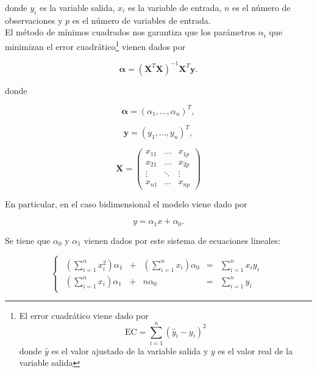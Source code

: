 donde $y_i$ es la variable salida, $x_{i}$ es la variable de entrada, $n$ es el número de observaciones y $p$ es el número de variables de entrada.\\

El método de mínimos cuadrados nos garantiza que los parámetros $\alpha_i$ que minimizan el error cuadrático\footnote{El error cuadrático viene dado por \begin{equation}
\mathrm{EC} = \sum_{i=1}^{n} (\hat{y}_i - y_i)^2 
\end{equation} 
donde $\hat{y}$ es el valor ajustado de la variable salida y $y$ es el valor real de la variable salida} vienen dados por

\begin{equation}
\boldsymbol{\alpha} = (\mathbf{X}^T \mathbf{X})^{-1} \mathbf{X}^T \mathbf{y}.
\end{equation}

donde 

\begin{equation*}
\mathbf{\alpha} = (\alpha_1,...,\alpha_n)^T,
\end{equation*}

\begin{equation*}
\mathbf{y} = (y_1,...,y_n)^T,
\end{equation*}

\begin{equation*}
\mathbf{X} = \left(\begin{matrix}
x_{11} & ... & x_{1p} \\
x_{21} & ... & x_{2p} \\
\vdots & \ddots & \vdots \\
x_{n1} & \dots & x_{np}
\end{matrix}\right)
\end{equation*}

En particular, en el caso bidimensional el modelo viene dado por

\begin{equation}
y = \alpha_1 x + \alpha_0.
\end{equation}

Se tiene que $\alpha_0$ y $\alpha_1$ vienen dados por este sistema de ecuaciones lineales:

\begin{equation}
\begin{cases}
\begin{array}{ccccc}
\left(\displaystyle\sum_{i=1}^{n} x_i^2\right) \alpha_1 & + & \left(\displaystyle\sum_{i=1}^{n} x_i\right) \alpha_0 & = & \displaystyle \sum_{i=1}^{n} x_i y_i \\
 \left(\displaystyle \sum_{i=1}^{n} x_i\right) \alpha_1 & + & n \alpha_0 & = & \displaystyle \sum_{i=1}^{n} y_i
\end{array}
\end{cases}
\end{equation}

